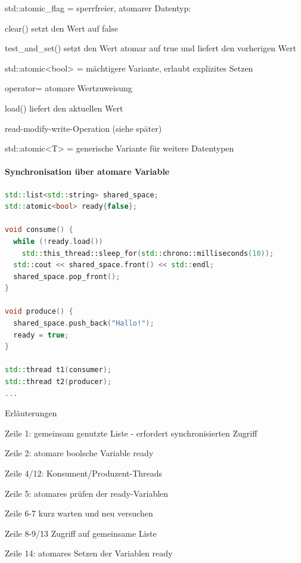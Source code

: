 \documentclass[10pt]{article}
\begin{document}
\begin{itemize*}
  \item std::atomic\_flag = sperrfreier, atomarer Datentyp:
  \begin{itemize*}
    \item clear() setzt den Wert auf false
    \item test\_and\_set() setzt den Wert atomar auf true und liefert den vorherigen Wert
  \end{itemize*}
  \item std::atomic<bool> = mächtigere Variante, erlaubt explizites Setzen
  \begin{itemize*}
    \item operator= atomare Wertzuweisung
    \item load() liefert den aktuellen Wert
    \item read-modify-write-Operation (siehe später)
  \end{itemize*}
  \item std::atomic<T> = generische Variante für weitere Datentypen
\end{itemize*}


\paragraph{Synchronisation über atomare Variable}

\begin{lstlisting}[language=C++]
std::list<std::string> shared_space;
std::atomic<bool> ready{false};

void consume() {
  while (!ready.load())
    std::this_thread::sleep_for(std::chrono::milliseconds(10));
  std::cout << shared_space.front() << std::endl;
  shared_space.pop_front();
}

void produce() {
  shared_space.push_back("Hallo!");
  ready = true;
}

std::thread t1(consumer);
std::thread t2(producer);
...
\end{lstlisting}
Erläuterungen
\begin{itemize*}
  \item Zeile 1: gemeinsam genutzte Liste - erfordert synchronisierten Zugriff
  \item Zeile 2: atomare boolsche Variable ready
  \item Zeile 4/12: Konsument/Produzent-Threads
  \item Zeile 5: atomares prüfen der ready-Variablen
  \item Zeile 6-7 kurz warten und neu versuchen
  \item Zeile 8-9/13 Zugriff auf gemeinsame Liste
  \item Zeile 14: atomares Setzen der Variablen ready
\end{itemize*}
\end{document}
